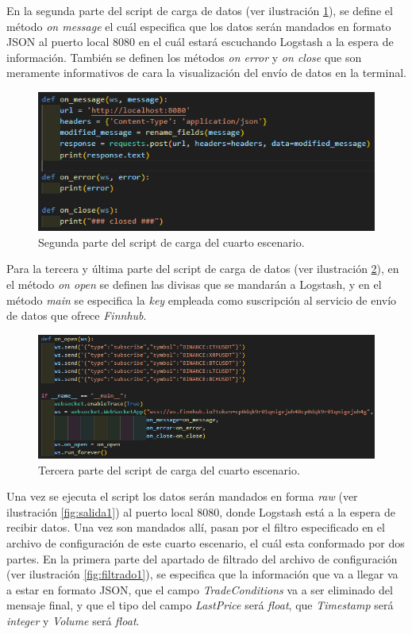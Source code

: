 En la segunda parte del script de carga de datos  (ver ilustración  \ref{fig:escenario42}), se define el método \textit{on message} el cuál especifica que los datos serán mandados en formato JSON al puerto local 8080 en el cuál estará escuchando Logstash a la espera de información. También se definen los métodos \textit{on error} y \textit{on close} que son meramente informativos de cara la visualización del envío de datos en la terminal.
\begin{figure}
    \centering
    \includegraphics[width=1\linewidth]{img/websocket2.png}
    \caption{Segunda parte del script de carga del cuarto escenario.}
    \label{fig:escenario42}
\end{figure}

Para la tercera y última parte del script de carga de datos  (ver ilustración  \ref{fig:escenario43}), en el método \textit{on open} se definen las divisas que se mandarán a Logstash, y en el método \textit{main} se especifica la \textit{key} empleada como suscripción al servicio de envío de datos que ofrece \textit{Finnhub}.

\begin{figure}
    \centering
    \includegraphics[width=1\linewidth]{img/websocket3.png}
    \caption{Tercera parte del script de carga del cuarto escenario.}
    \label{fig:escenario43}
\end{figure}
Una vez se ejecuta el script los datos serán mandados en forma \textit{raw}  (ver ilustración  \ref{fig:salida1}) al puerto local 8080, donde Logstash está a la espera de recibir datos. Una vez son mandados allí, pasan por el filtro especificado en el archivo de configuración de este cuarto escenario, el cuál esta conformado por dos partes. En la primera parte del apartado de filtrado del archivo de configuración  (ver ilustración  \ref{fig:filtrado1}), se especifica que la información que va a llegar va a estar en formato JSON, que el campo \textit{TradeConditions} va a ser eliminado del mensaje final, y que el tipo del campo \textit{LastPrice} será \textit{float}, que \textit{Timestamp} será \textit{integer} y \textit{Volume} será \textit{float}.


